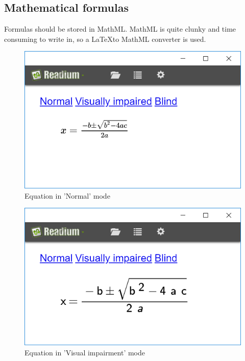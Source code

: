 \subsection{Mathematical formulas}

Formulas should be stored in MathML. MathML is quite clunky and time consuming to write in, so a \LaTeX to MathML converter is used. %

\begin{figure}[H]
	\centering
	\includegraphics[width=\linewidth*2/3]{figures/EquationNo.PNG}
	\caption{Equation in 'Normal' mode}
	\label{fig:equation_normal}
\end{figure}
\vspace{-0.6cm}
\begin{figure}[H]
	\centering
	\includegraphics[width=\linewidth*2/3]{figures/EquationVi.PNG}
	\caption{Equation in 'Visual impairment' mode}
	\label{fig:equation_viimp}
\end{figure}



